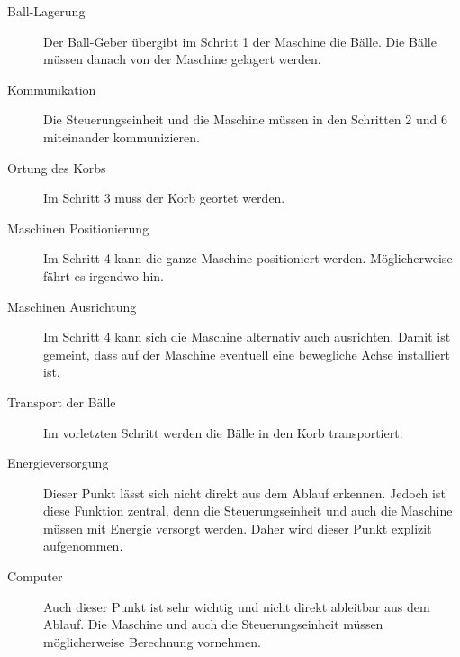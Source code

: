\begin{description}
    \item [Ball-Lagerung] Der Ball-Geber übergibt im Schritt 1 der 
        Maschine die Bälle. Die Bälle müssen danach von der Maschine 
        gelagert werden.
    \item [Kommunikation] Die Steuerungseinheit und die Maschine müssen 
        in den Schritten 2 und 6 miteinander kommunizieren.
    \item [Ortung des Korbs] Im Schritt 3 muss der Korb geortet werden.
    \item [Maschinen Positionierung] Im Schritt 4 kann die ganze Maschine
    positioniert werden. Möglicherweise fährt es irgendwo hin.
    \item [Maschinen Ausrichtung] Im Schritt 4 kann sich die Maschine alternativ
    auch ausrichten. Damit ist gemeint, dass auf der Maschine eventuell
    eine bewegliche Achse installiert ist.
    \item [Transport der Bälle] Im vorletzten Schritt werden die Bälle 
        in den Korb transportiert.
    \item [Energieversorgung] Dieser Punkt lässt sich nicht direkt aus 
        dem Ablauf erkennen. Jedoch ist diese Funktion zentral, denn 
        die Steuerungseinheit und auch die Maschine müssen mit Energie 
        versorgt werden. Daher wird dieser Punkt explizit aufgenommen.
    \item [Computer] Auch dieser Punkt ist sehr wichtig und nicht direkt 
        ableitbar aus dem Ablauf. Die Maschine und auch die 
        Steuerungseinheit müssen möglicherweise Berechnung vornehmen.
\end{description}
